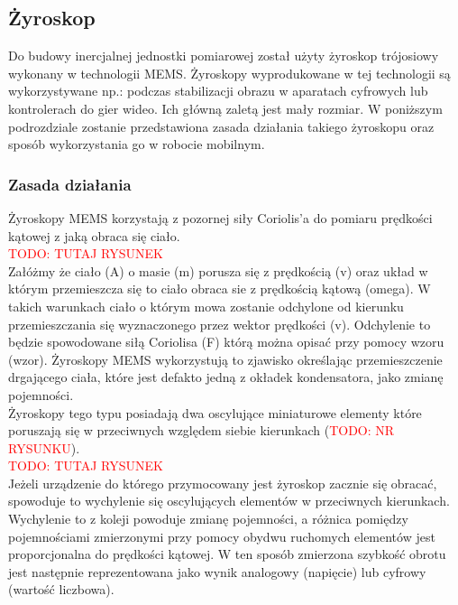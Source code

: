\subsection{Żyroskop}
Do budowy inercjalnej jednostki pomiarowej został użyty żyroskop trójosiowy wykonany w technologii MEMS. 
Żyroskopy wyprodukowane w tej technologii są wykorzystywane np.: podczas stabilizacji obrazu w aparatach 
cyfrowych lub kontrolerach do gier wideo. Ich główną zaletą jest mały rozmiar. W poniższym podrozdziale 
zostanie  przedstawiona zasada działania takiego żyroskopu oraz sposób wykorzystania go w robocie mobilnym.

\subsubsection{Zasada działania}
Żyroskopy MEMS korzystają z pozornej siły Coriolis'a do pomiaru prędkości kątowej z jaką obraca się ciało.
\\
\textcolor{red}{TODO: TUTAJ RYSUNEK}
\\
Załóżmy że ciało (A) o masie (m) porusza się z prędkością (v) oraz układ w którym przemieszcza się to ciało obraca sie 
z prędkością kątową (omega). W takich warunkach ciało o którym mowa zostanie odchylone od kierunku przemieszczania się 
wyznaczonego przez wektor prędkości (v). Odchylenie to będzie spowodowane siłą Coriolisa (F) którą można opisać przy 
pomocy wzoru (wzor). Żyroskopy MEMS wykorzystują to zjawisko określając przemieszczenie drgającego ciała, które jest
defakto jedną z okładek kondensatora, jako zmianę pojemności.
\\
Żyroskopy tego typu posiadają dwa oscylujące miniaturowe elementy które poruszają się w przeciwnych względem
siebie kierunkach (\textcolor{red}{TODO: NR RYSUNKU}). 
\\
\textcolor{red}{TODO: TUTAJ RYSUNEK}
\\
Jeżeli urządzenie do którego przymocowany jest żyroskop zacznie się obracać, spowoduje to
wychylenie się oscylujących elementów w przeciwnych kierunkach. Wychylenie to z koleji powoduje zmianę pojemności, a
różnica pomiędzy pojemnościami zmierzonymi przy pomocy obydwu ruchomych elementów jest proporcjonalna do prędkości
kątowej. W ten sposób zmierzona szybkość obrotu jest następnie reprezentowana jako wynik analogowy (napięcie) lub cyfrowy
(wartość liczbowa).
\\
